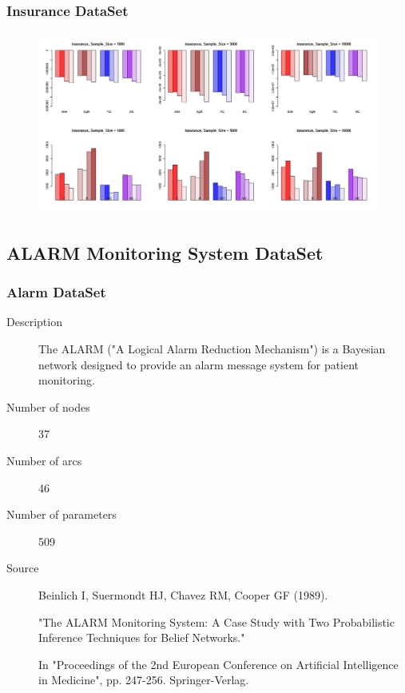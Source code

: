 \documentclass{beamer}
\begin{document}
\begin{frame}
\frametitle{Insurance DataSet}
{\scriptsize{}
	\begin{figure}
		\includegraphics[height=170pt]{images/Real_2_Insurance}
	\end{figure}		
}
\end{frame}



\subsection{ALARM Monitoring System DataSet}
\begin{frame}
\frametitle{Alarm DataSet}
{\scriptsize{}
\begin{description}
	\item[Description] The ALARM ("A Logical Alarm Reduction Mechanism") is a Bayesian network designed to provide an alarm message system for patient monitoring.
	
	\item[Number of nodes] 37
	
	\item[Number of arcs] 46
	
	\item[Number of parameters] 509
	
	\item[Source]  Beinlich I, Suermondt HJ, Chavez RM, Cooper GF (1989).
	
	"The ALARM Monitoring System: A Case Study with Two Probabilistic Inference Techniques for Belief Networks."
	
	In "Proceedings of the 2nd European Conference on Artificial Intelligence in Medicine", pp. 247-256. Springer-Verlag.
\end{description}
}
\end{frame}
\end{document}
